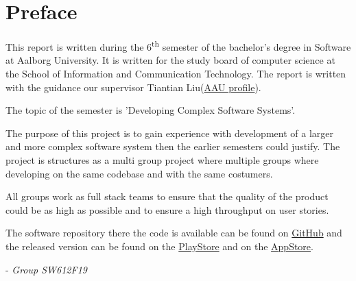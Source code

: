 \chapter*{Preface}
This report is written during the 6\textsuperscript{th} semester of the bachelor's degree in Software at Aalborg University.
It is written for the study board of computer science at the School of Information and Communication Technology.
The report is written with the guidance our supervisor Tiantian Liu(\href{http://personprofil.aau.dk/profil/145323}{AAU profile}).

The topic of the semester is 'Developing Complex Software Systems'.

The purpose of this project is to gain experience with development of a larger and more complex software system then the earlier semesters could justify. 
The project is structures as a multi group project where multiple groups where developing on the same codebase and with the same costumers. 

All groups work as full stack teams to ensure that the quality of the product could be as high as possible and to ensure a high throughput on user stories.

The software repository there the code is available can be found on \href{https://github.com/aau-giraf/}{GitHub} and the released version can be found on the \href{https://play.google.com/store/apps/details?id=dk.aau.cs.giraf.weekplanner}{PlayStore} and on the \href{https://github.com/aau-giraf}{AppStore}.

- \textit{Group SW612F19}

\newpage
